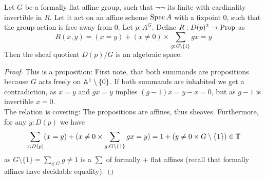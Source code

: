 %
\begin{prop}
	Let $G$ be a formally \etale flat affine group, such that $\lnot \lnot$ its finite with cardinality invertible in $R$. Let it act on an affine scheme $\operatorname{Spec} A$ with a fixpoint 0, such that the group action is free away from 0.
	Let $p : A^G$. Define $R: D(p)^2 \to \operatorname{Prop}$ as
	\[
	R(x,y) = (x = y) + (x \neq 0) \times \sum_{g : G \setminus \{1\}} g x = y
	\]
	Then the sheaf quotient $D(p) / G$ is an algebraic space.
\end{prop}
\begin{proof}
	This is a proposition: First note, that both summands are propositions because $G$ acts freely on $\mathbb{A}^1 \setminus \{0\}$. If both summands are inhabited we get a contradiction, as $x = y$ and $gx = y$ implies $(g-1) x = y - x = 0$, but as $g-1$ is invertible $x = 0$. \\
	The relation is covering: 
	The propositions are affines, thus sheaves. Furthermore, for any $y : D(p)$ we have
	\[
	\sum_{x : D(p)}  (x = y) + (x \neq 0 \times \sum_{g : G \setminus \{1\}} gx = y) = 1 + (y \neq 0 \times G \setminus \{1\}) \in \mathbb{T}
	\]
	as $G \setminus \{1\} = \sum_{g : G} g \neq 1$ is a $\sum$ of formally \etale + flat affines (recall that formally \etale affines have decidable equality).
	
\end{proof}
